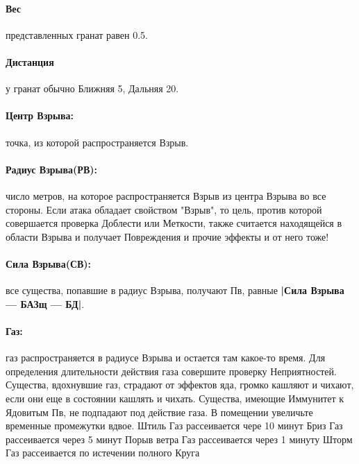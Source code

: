 \paragraph{Вес} представленных гранат равен 0.5.
\paragraph{Дистанция} у гранат обычно Ближняя 5, Дальняя 20.
\paragraph{Центр Взрыва:} точка, из которой распространяется Взрыв.
\paragraph{Радиус Взрыва(РВ):} число метров, на которое распространяется Взрыв из центра Взрыва во все стороны. Если атака обладает свойством "Взрыв", то цель, против которой совершается проверка Доблести или Меткости, также считается находящейся в области Взрыва и получает Повреждения и прочие эффекты и от него тоже!
\paragraph{Сила Взрыва(СВ):} все существа, попавшие в радиус Взрыва, получают Пв, равные \textbf{|Сила Взрыва — БАЗщ — БД|}.
\paragraph{Газ:} газ распространяется в радиусе Взрыва и остается там какое-то время. Для определения длительности действия газа совершите проверку Неприятностей. Существа, вдохнувшие газ, страдают от эффектов яда, громко кашляют и чихают, если они еще в состоянии кашлять и чихать. Существа, имеющие Иммунитет к Ядовитым Пв, не подпадают под действие газа. В помещении увеличьте временные промежутки вдвое.
\trouble
{Штиль}%
{Газ рассеивается чере 10 минут}%
{Бриз}%
{Газ рассеивается через 5 минут}%
{Порыв ветра}%
{Газ рассеивается через 1 минуту}%
{Шторм}%
{Газ рассеивается по истечении полного Круга}%

